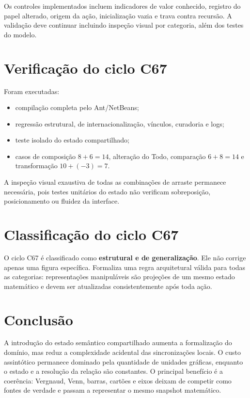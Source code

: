 \documentclass[12pt,a4paper]{article}
\begin{document}
Os controles implementados incluem indicadores de valor conhecido, registro do papel alterado, origem da ação, inicialização vazia e trava contra recursão. A validação deve continuar incluindo inspeção visual por categoria, além dos testes do modelo.

\section{Verificação do ciclo C67}

Foram executadas:
\begin{itemize}[noitemsep]
  \item compilação completa pelo Ant/NetBeans;
  \item regressão estrutural, de internacionalização, vínculos, curadoria e logs;
  \item teste isolado do estado compartilhado;
  \item casos de composição $8+6=14$, alteração do Todo, comparação $6+8=14$ e transformação $10+(-3)=7$.
\end{itemize}

A inspeção visual exaustiva de todas as combinações de arraste permanece necessária, pois testes unitários do estado não verificam sobreposição, posicionamento ou fluidez da interface.

\section{Classificação do ciclo C67}

O ciclo C67 é classificado como \textbf{estrutural e de generalização}. Ele não corrige apenas uma figura específica. Formaliza uma regra arquitetural válida para todas as categorias: representações manipuláveis são projeções de um mesmo estado matemático e devem ser atualizadas consistentemente após toda ação.

\section{Conclusão}

A introdução do estado semântico compartilhado aumenta a formalização do domínio, mas reduz a complexidade acidental das sincronizações locais. O custo assintótico permanece dominado pela quantidade de unidades gráficas, enquanto o estado e a resolução da relação são constantes. O principal benefício é a coerência: Vergnaud, Venn, barras, cartões e eixos deixam de competir como fontes de verdade e passam a representar o mesmo snapshot matemático.
\end{document}
